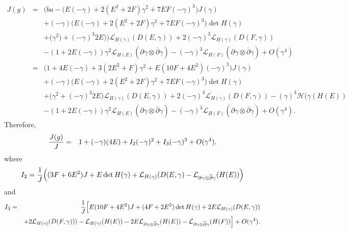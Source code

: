 \documentclass[12pt]{amsart}
\def\d{\partial}
\def\dbar{\overline{\partial}}
\def\d{\partial}
\def\cal{\mathcal}
\begin{document}
\begin{eqnarray*}
J(g)&=&\Big( b  a - \Big(E(-\gamma)+2(E^2+2F)\gamma^2+7EF(-\gamma)^3\Big) J(\gamma)\\
&&+ (-\gamma) \Big(E(-\gamma)+2(E^2+2F)\gamma^2+7EF(-\gamma)^3\Big)\det H(\gamma) \\
&&+\Big(\gamma^2)+(-\gamma)^3 2E) \Big){\cal L}_{H(\gamma)} (D(E, \gamma))+2  (-\gamma) ^3 {\cal L}_{H(\gamma)} (D(F, \gamma))
 \\
&&-(1+2E(-\gamma)) \gamma^2 {\cal L}_{H(E)}(\d \gamma\otimes \dbar \gamma)-(-\gamma)^3 {\cal L}_{H(F)}(\d \gamma \otimes \dbar \gamma) +O(\gamma^4 )\\
&=&\Big( 1+4E(-\gamma)+ 3(2E^2+F)\gamma^2+E(10F+4E^2)(-\gamma)^3\Big) J(\gamma)\\
&&+ (-\gamma) \Big(E(-\gamma)+2(E^2+2F)\gamma^2+7EF(-\gamma)^3\Big)\det H(\gamma) \\
&&+\Big( \gamma^2+(-\gamma)^3 2E\Big)  {\cal L}_{H(\gamma)} (D(E, \gamma))+2  (-\gamma) ^3 {\cal L}_{H(\gamma)} (D(F, \gamma))-(\gamma)^3{\cal H(\gamma}(H(E))
 \\
&&-(1+2E(-\gamma)) \gamma^2 {\cal L}_{H(E)}(\d \gamma\otimes \dbar \gamma)-(-\gamma)^3 {\cal L}_{H(F)}(\d \gamma \otimes \dbar \gamma) +O(\gamma^4 ).
\end{eqnarray*}
Therefore,
\begin{eqnarray}\label{J(j)/J}
{J(g)\over J} 
&=&1  +(-\gamma)(4E) +I_2(-\gamma)^2+I_3(-\gamma)^3+O(\gamma^4),
\end{eqnarray}
where
$$
I_2={1\over J} \Big((3F+6E^2) J+E \det H(\gamma) +{\cal L}_{H(\gamma)}(D(E, \gamma)-{\cal L}_{\d \gamma \otimes \dbar \gamma}(H(E))\Big)
$$
and
\begin{eqnarray*}
I_3&=&{1\over J} \Big[E(10F+4E^2)J +(4F+2E^2)\det H(\gamma)+2E{\cal L}_{H(\gamma)}(D(E, \gamma)) \\
&&+  2  {\cal L}_{H(\gamma)} ( D(F, \gamma) ) ) -{\cal L}_{H(\gamma)}(H(E)) -2E {\cal L }_{\d \gamma\otimes \dbar \gamma}(H(E)) 
-{\cal L}_{\d \gamma \otimes \dbar \gamma}(H(F)) \Big]+O(\gamma^4 ).
\end{eqnarray*}
\end{document}
